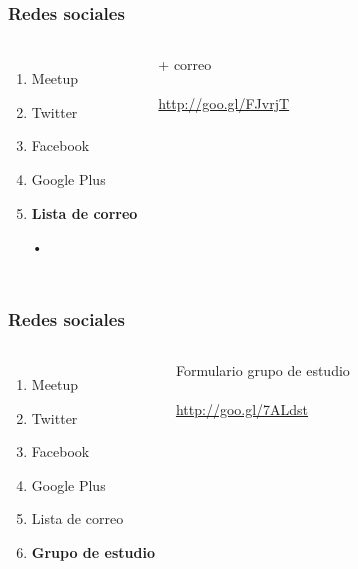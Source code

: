 \documentclass{beamer}
\begin{document}
\begin{frame}
\frametitle{Redes sociales}
\begin{columns}[c] %

\begin{enumerate}
\item Meetup
\item Twitter
\item Facebook
\item Google Plus
\item \textbf{Lista de correo}
\item[•]	
\end{enumerate}

{\color{blue}+ correo}
\\~\\
{\color{blue}\url{http://goo.gl/FJvrjT}}
\end{columns}
\end{frame}
\begin{frame}
\frametitle{Redes sociales}
\begin{columns}[c] %

\begin{enumerate}
\item Meetup
\item Twitter
\item Facebook
\item Google Plus
\item Lista de correo
\item \textbf{Grupo de estudio}
\end{enumerate}

{\color{blue}Formulario grupo de estudio}
\\~\\
{\color{blue}\url{http://goo.gl/7ALdst}}
\end{columns}
\end{frame}
\end{document}
